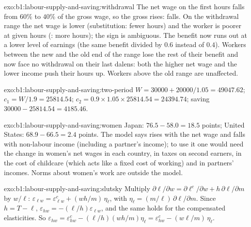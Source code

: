 \begin{solution}{exo:b1:labour-supply-and-saving:withdrawal}
The net wage on the first hours falls from $60\%$ to $40\%$ of the gross wage,
so the gross  rises:  falls. On the
withdrawal range the net wage is lower (substitution: fewer hours) and the
worker is poorer at given hours (: more hours); the sign is
ambiguous. The benefit now runs out at a lower level of earnings (the same
benefit divided by $0.6$ instead of $0.4$). Workers between the new and the
old end of the range lose the rest of their benefit and now face no
withdrawal on their last dalens: both the higher net wage and the lower
income push their hours up. Workers above the old range are unaffected.
\end{solution}

\begin{solution}{exo:b1:labour-supply-and-saving:two-period}
$W = 30000 + 20000/1.05 = 49047.62$; $c_1 = W/1.9 = 25814.54$;
$c_2 = 0.9 \times 1.05 \times 25814.54 = 24394.74$; saving $30000 - 25814.54 = 4185.46$.
\end{solution}

\begin{solution}{exo:b1:labour-supply-and-saving:women}
Japan: $76.5 - 58.0 = 18.5$ points; United States: $68.9 - 66.5 = 2.4$ points. The
model says  rises with the net wage and falls with non-labour
income (including a partner's income); to use it one would need the change
in women's net wages in each country, in taxes on second earners, in the
cost of childcare (which acts like a fixed cost of working) and in partners'
incomes. Norms about women's work are outside the model.
\end{solution}

\begin{solution}{exo:b1:labour-supply-and-saving:slutsky}
Multiply $\partial\ell/\partial w = \partial\ell^c/\partial w + h\,\partial\ell/\partial m$ by
$w/\ell$: $\varepsilon_{\ell w} = \varepsilon^c_{\ell w} + (wh/m)\,\eta_\ell$, with
$\eta_\ell = (m/\ell)\,\partial\ell/\partial m$. Since $h = T - \ell$,
$\varepsilon_{hw} = -(\ell/h)\varepsilon_{\ell w}$, and the same holds for the
compensated elasticities. So
$\varepsilon_{hw} = \varepsilon^c_{hw} - (\ell/h)(wh/m)\eta_\ell = \varepsilon^c_{hw} - (w\ell/m)\,\eta_\ell$.
\end{solution}


